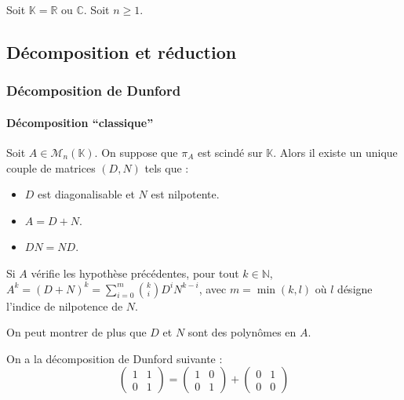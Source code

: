 



  
  Soit $\mathbb{K} = \mathbb{R}$ ou $\mathbb{C}$. Soit $n \geq 1$.

  \subsection{Décomposition et réduction}
  
  \subsubsection{Décomposition de Dunford}
  
  \paragraph{Décomposition ``classique''}
  
  
  \begin{theorem}
    Soit $A \in \mathcal{M}_n(\mathbb{K})$. On suppose que $\pi_A$ est scindé sur $\mathbb{K}$. Alors il existe un unique couple de matrices $(D, N)$ tels que :
    \begin{itemize}
      \item $D$ est diagonalisable et $N$ est nilpotente.
      \item $A = D + N$.
      \item $DN = ND$.
    \end{itemize}
  \end{theorem}
  
  \begin{corollary}
    Si $A$ vérifie les hypothèse précédentes, pour tout $k \in \mathbb{N}$, $A^k = (D + N)^k = \sum_{i=0}^m \binom{k}{i} D^i N^{k-i}$, avec $m = \min(k, l)$ où $l$ désigne l'indice de nilpotence de $N$.
  \end{corollary}
  
  \begin{remark}
    On peut montrer de plus que $D$ et $N$ sont des polynômes en $A$.
  \end{remark}
  
  
  \begin{example}
    On a la décomposition de Dunford suivante :
    \[ \begin{pmatrix} 1 & 1 \\ 0 & 1 \end{pmatrix} = \begin{pmatrix} 1 & 0 \\ 0 & 1 \end{pmatrix} + \begin{pmatrix} 0 & 1 \\ 0 & 0 \end{pmatrix} \]
  \end{example}
  

